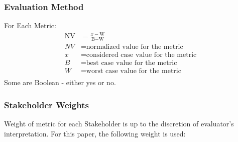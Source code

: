 \begin{frame}
	\frametitle{Evaluation Method}
	For Each Metric:
	\begin{align} 
		\mbox{NV} &= \frac{x-\mbox{W}}{\mbox{B}-\mbox{W}}\\
		NV &= \mbox{normalized value for the metric}\\
		x &= \mbox{considered case value for the metric}\\
		B &= \mbox{best case value for the metric}\\
		W &= \mbox{worst case value for the metric}\\
	\end{align}
	Some are Boolean - either yes or no.
\end{frame}

\begin{frame}
	\frametitle{Stakeholder Weights}
	Weight of metric for each Stakeholder is up to the discretion of evaluator's interpretation.
	For this paper, the following weight is used:
	\begin{table}[h]
		\centering
		\caption {Metrics and Weight for Each Stakeholder}
		\label{tab:stakeholders_weight}
		\end{table}
	\end{frame}